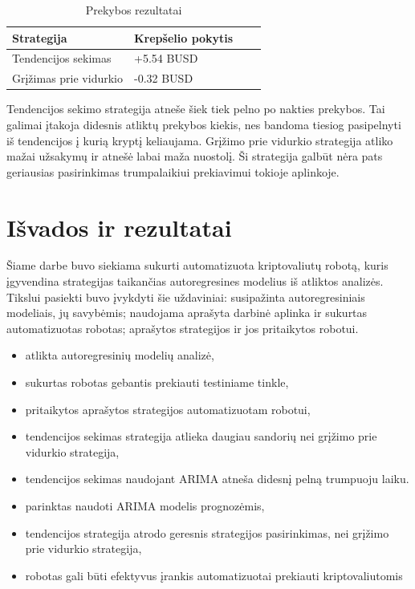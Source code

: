 \documentclass{VUMIFInfKursinis}
\begin{document}
\begin{table}[H]
  \centering
  \begin{tabularx}{\linewidth}{|X|X|X|X|}
    \hline
    Strategija             & Krepšelio pokytis \\
    \hline
    Tendencijos sekimas    & +5.54 BUSD        \\
    \hline
    Grįžimas prie vidurkio & -0.32 BUSD        \\
    \hline
  \end{tabularx}
  \caption{Prekybos rezultatai}
  \label{table:preykos_rezultatai}
\end{table}

Tendencijos sekimo strategija atneše šiek tiek pelno po nakties prekybos. Tai galimai įtakoja didesnis atliktų prekybos kiekis, nes bandoma tiesiog pasipelnyti iš tendencijos į kurią kryptį keliaujama. Grįžimo prie vidurkio strategija atliko 
mažai užsakymų ir atnešė labai maža nuostolį. Ši strategija galbūt nėra pats geriausias pasirinkimas trumpalaikiui prekiavimui
tokioje aplinkoje.

\section{Išvados ir rezultatai}

Šiame darbe buvo siekiama sukurti automatizuota kriptovaliutų robotą, kuris įgyvendina strategijas taikančias autoregresines modelius iš atliktos analizės.
Tikslui pasiekti buvo įvykdyti šie uždaviniai: susipažinta  autoregresiniais modeliais, jų savybėmis; naudojama aprašyta darbinė aplinka ir sukurtas
automatizuotas robotas; aprašytos strategijos ir jos pritaikytos robotui. 

\begin{itemize}
  \item atlikta autoregresinių modelių analizė,
  \item sukurtas robotas gebantis prekiauti testiniame tinkle,
  \item pritaikytos aprašytos strategijos automatizuotam robotui,
  \item tendencijos sekimas strategija atlieka daugiau sandorių nei grįžimo prie vidurkio strategija,
  \item tendencijos sekimas naudojant ARIMA atneša didesnį pelną trumpuoju laiku.
  \item parinktas naudoti ARIMA modelis prognozėmis,
  \item tendencijos strategija atrodo geresnis strategijos pasirinkimas, nei grįžimo prie vidurkio strategija,
  \item robotas gali būti efektyvus įrankis automatizuotai prekiauti kriptovaliutomis
\end{itemize}
\end{document}
